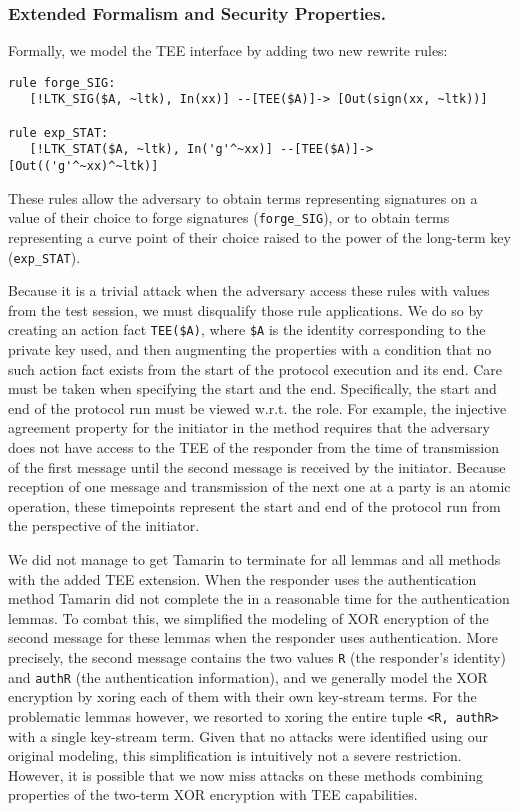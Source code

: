 \subsubsection{Extended Formalism and Security Properties.}
\label{sec:TEE:fmAndProps}
Formally, we model the TEE interface by adding two new rewrite rules:
%
\begin{small}
\begin{verbatim}
rule forge_SIG:
   [!LTK_SIG($A, ~ltk), In(xx)] --[TEE($A)]-> [Out(sign(xx, ~ltk))]

rule exp_STAT:
   [!LTK_STAT($A, ~ltk), In('g'^~xx)] --[TEE($A)]-> [Out(('g'^~xx)^~ltk)]
\end{verbatim}
\end{small}
%
These rules allow the adversary to obtain terms representing signatures on a
value of their choice to forge signatures (\verb|forge_SIG|), or to obtain terms
representing a curve point of their choice raised to the power of the
long-term key (\verb|exp_STAT|).
%

Because it is a trivial attack when the adversary access these rules with values
from the test session, we must disqualify those rule applications.
%
We do so by creating an action fact \verb|TEE($A)|, where \verb|$A| is the
identity corresponding to the private key used, and then augmenting the
properties with a condition that no such action fact exists from the start of
the protocol execution and its end.
%
Care must be taken when specifying the start and the end.
%
Specifically, the start and end of the protocol run must be viewed w.r.t. the
role.
%
For example, the injective agreement property for the initiator in
the \mSigSig{} method requires that the adversary does not have access to the
TEE of the
responder from the time of transmission of the first message until the second
message is received by the initiator.
%
Because reception of one message and transmission of the next one at a party
is an atomic operation, these timepoints represent the start and end of the
protocol run from the perspective of the initiator.
%

We did not manage to get Tamarin to terminate for all lemmas and all methods
with the added TEE extension.
%
When the responder uses the \mStat{} authentication method Tamarin did not
complete the in a reasonable time for the authentication lemmas.
%
To combat this, we simplified the modeling of XOR encryption of the second
message for these lemmas when the responder uses \mStat{} authentication.
%
More precisely, the second message contains the two values \verb|R| (the
responder's identity) and
\verb|authR| (the authentication information), and we generally model the
XOR encryption by xoring each of them with their own key-stream terms.
%
For the problematic lemmas however, we resorted to xoring the entire tuple
\verb|<R, authR>| with a single key-stream term.
%
Given that no attacks were identified using our original modeling, this
simplification is intuitively not a severe restriction.
%
However, it is possible that we now miss attacks on these methods
combining properties of the two-term XOR encryption with TEE capabilities.
%


